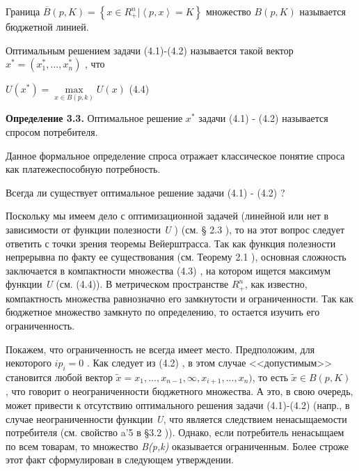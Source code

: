 \documentclass[12pt, 4paper]{book}
\begin{document}
{Граница $\overline{B}(p,K) =  \left\{ x \in R_{+}^{n}| \left\langle p,x \right\rangle = K \right\} $ множество $B(p,K)$ называется бюджетной линией.
\par

Оптимальным решением задачи (4.1)-(4.2) называется такой вектор $x^{*} =(x_{1}^{*},...,x_{n}^{*})$ , что 
\begin{center}
$U(x^{*})= \max \limits_{x \in B(p,k)}  U(x)$ (4.4)
\end{center}
\par

\textbf{Определение 3.3.} Оптимальное решение $x^{*}$ задачи (4.1) - (4.2) называется спросом потребителя. 
\par

Данное формальное определение спроса отражает классическое понятие спроса как платежеспособную потребность. 
\par

Всегда ли существует оптимальное решение задачи (4.1) - (4.2) ?
\par

Поскольку мы имеем дело с оптимизационной задачей (линейной или нет в зависимости от функции полезности \textit{U} ) (см. § 2.3 ), то на этот вопрос следует ответить с точки зрения теоремы Вейерштрасса. Так как функция полезности непрерывна по факту ее существования (см. Теорему 2.1 ), основная сложность заключается в компактности множества (4.3) , на котором ищется максимум функции \textit{U} (см. (4.4)). В метрическом пространстве  $R_{+}^{n}$, как известно, компактность множества равнозначно его замкнутости и ограниченности. Так как бюджетное множество замкнуто по определению, то остается изучить его ограниченность.
\par

Покажем, что ограниченность не всегда имеет место. Предположим, для некоторого $i p_i=0$ . Как следует из (4.2) , в этом случае <<допустимым>> становится любой вектор $\widetilde{x}=x_1,...,x_{n-1},\infty, x_{i+1},...,x_n)$, то есть $\widetilde{x} \in B(p,K)$ , что говорит о неограниченности бюджетного множества. А это, в свою очередь, может привести к отсутствию оптимального решения задачи (4.1)-(4.2) (напр., в случае неограниченности функции \textit{U}, что является следствием ненасыщаемости потребителя (см. свойство a'5 в §3.2 )). Однако, если потребитель ненасыщаем по всем товарам, то множество  \textit{B(p,k)} оказывается ограниченным. Более строже этот факт сформулирован в следующем утверждении.
\par

}
\end{document}

